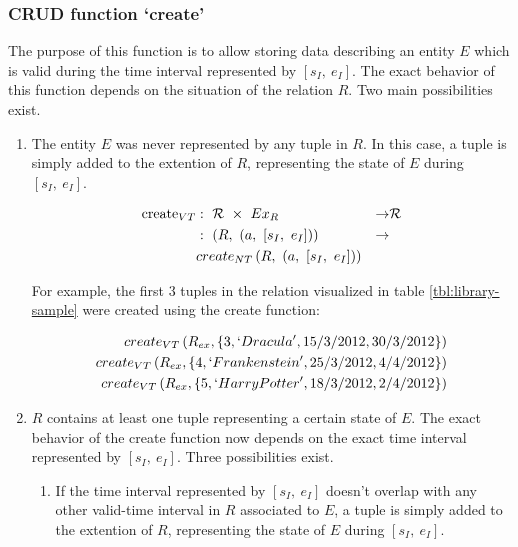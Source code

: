 \subsubsection{\label{subsubsec:insert}CRUD function `create'}
The purpose of this function is to allow storing data describing an entity $E$ which is valid during the time interval represented by $\left[s_{I},\ e_{I}\right]$. The exact behavior of this function depends on the situation of the relation $R$. Two main possibilities exist.
\begin{enumerate}
\item The entity $E$ was never represented by any tuple in $R$. In this case, a tuple is simply added to the extention of $R$, representing the state of $E$ during $\left[s_{I},\ e_{I}\right]$. %

\begin{align}
\text{create}_{VT} & :\ \Rel\ \times\ Ex_{R} & \rightarrow & \Rel \nonumber \\
							& :\ \left(R,\ \left(a,\ \left[s_{I},\ e_{I}\right]\right)\right) & \rightarrow \nonumber \\ 
							& create_{NT}\left(R,\ \left(a,\ \left[s_{I},\ e_{I}\right]\right)\right)
							\nonumber
\end{align}

For example, the first 3 tuples in the relation visualized in table \ref{tbl:library-sample} were created using the create function:

\begin{align}
create_{VT}\left(R_{ex}, \left\{3, `Dracula', 15/3/2012, 30/3/2012\right\}\right) \nonumber \\
create_{VT}\left(R_{ex}, \left\{4, `Frankenstein', 25/3/2012, 4/4/2012\right\}\right) \nonumber \\
create_{VT}\left(R_{ex}, \left\{5, `Harry Potter', 18/3/2012, 2/4/2012\right\}\right) \nonumber
\end{align}


\item $R$ contains at least one tuple representing a certain state of $E$. The exact behavior of the create function now depends on the exact time interval represented by $\left[s_{I},\ e_{I}\right]$. Three possibilities exist.
	\begin{enumerate}
	\item If the time interval represented by $\left[s_{I},\ e_{I}\right]$ doesn't overlap with any other valid-time interval in $R$ associated to $E$, a tuple is simply added to the extention of $R$, representing the state of $E$ during $\left[s_{I},\ e_{I}\right]$.


\end{enumerate}
\end{enumerate}
